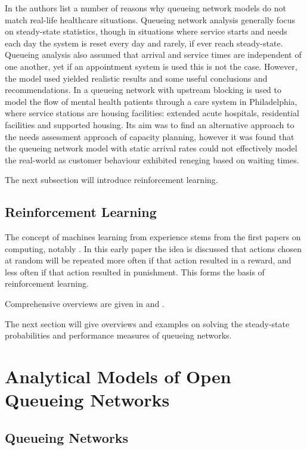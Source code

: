 \documentclass{article}
\begin{document}
In \cite{albinetal90} the authors list a number of reasons why queueing network models do not match real-life healthcare situations.
Queueing network analysis generally focus on steady-state statistics, though in situations where service starts and needs each day the system is reset every day and rarely, if ever reach steady-state.
Queueing analysis also assumed that arrival and service times are independent of one another, yet if an appointment system is used this is not the case.
However, the model used yielded realistic results and some useful conclusions and recommendations.
In \cite{koizumietal05} a queueing network with upstream blocking is used to model the flow of mental health patients through a care system in Philadelphia, where service stations are housing facilities: extended acute hospitals, residential facilities and supported housing.
Its aim was to find an alternative approach to the needs assessment approach of capacity planning, however it was found that the queueing network model with static arrival rates could not effectively model the real-world as customer behaviour exhibited reneging based on waiting times.

The next subsection will introduce reinforcement learning.

\subsection{Reinforcement Learning}

The concept of machines learning from experience stems from the first papers on computing, notably \cite{turing50}.
In this early paper the idea is discussed that actions chosen at random will be repeated more often if that action resulted in a reward, and less often if that action resulted in punishment.
This forms the basis of reinforcement learning.

Comprehensive overviews are given in \cite{suttonbarto98} and \cite{szepesvari10}.

The next section will give overviews and examples on solving the steady-state probabilities and performance measures of queueing networks.

\section{Analytical Models of Open Queueing Networks}


\subsection {Queueing Networks}
\end{document}
